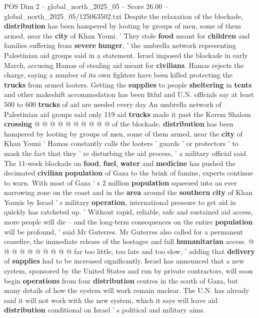 \begin{textsample}{POS Dim 2 – global\_north\_2025\_05 – Score 26.00 – global\_north\_2025\_05/125063502.txt}
Despite the relaxation of the blockade, \textbf{distribution} has been hampered by looting by groups of men, some of them armed, near the \textbf{city} of Khan Youni. ' They stole \textbf{food} meant for \textbf{children} and families suffering from \textbf{severe} \textbf{hunger}, ' the umbrella network representing Palestinian aid groups said in a statement.
Israel imposed the blockade in early March, accusing Hamas of stealing aid meant for \textbf{civilians}.
Hamas rejects the charge, saying a number of its own fighters have been killed protecting the \textbf{trucks} from armed looters.
Getting the \textbf{supplies} to people \textbf{sheltering} in \textbf{tents} and other makeshift accommodation has been fitful and U.N. officials say at least 500 to 600 \textbf{trucks} of aid are needed every day An umbrella network of Palestinian aid groups said only 119 aid \textbf{trucks} made it past the Kerem Shalom \textbf{crossing} @ @ @ @ @ @ @ @ @ @ of the blockade, \textbf{distribution} has been hampered by looting by groups of men, some of them armed, near the \textbf{city} of Khan Youni ' Hamas constantly calls the looters ' guards ' or protectors ' to mask the fact that they ' re disturbing the aid process, ' a military official said.
The 11-week blockade on \textbf{food}, \textbf{fuel}, \textbf{water} and \textbf{medicine} has pushed the decimated \textbf{civilian} \textbf{population} of Gaza to the brink of famine, experts continue to warn.
With most of Gaza ' s 2 million \textbf{population} squeezed into an ever narrowing zone on the coast and in the \textbf{area} around the \textbf{southern} \textbf{city} of Khan Younis by Israel ' s military \textbf{operation}, international pressure to get aid in quickly has ratcheted up. ' Without rapid, reliable, safe and sustained aid access, more people will die -- and the long-term consequences on the entire \textbf{population} will be profound, ' said Mr Guterres.
Mr Guterres also called for a permanent ceasefire, the immediate release of the hostages and full \textbf{humanitarian} access. @ @ @ @ @ @ @ @ @ @ far too little, too late and too slow, ' adding that \textbf{delivery} of \textbf{supplies} had to be increased significantly.
Israel has announced that a new system, sponsored by the United States and run by private contractors, will soon begin \textbf{operations} from four \textbf{distribution} centres in the south of Gaza, but many details of how the system will work remain unclear.
The U.N. has already said it will not work with the new system, which it says will leave aid \textbf{distribution} conditional on Israel ' s political and military aims.

\end{textsample}
